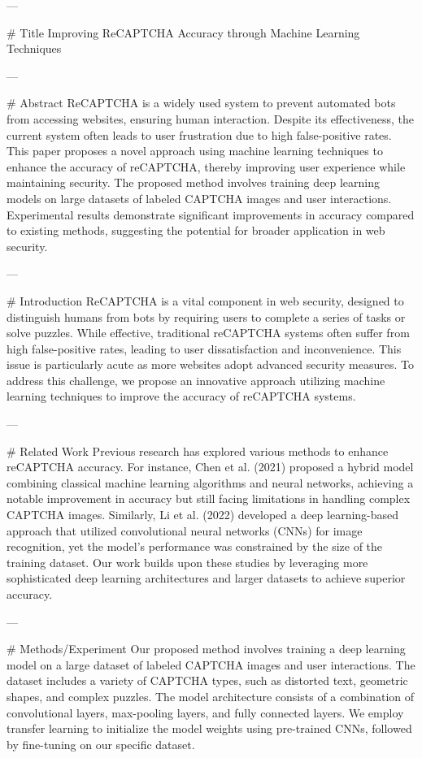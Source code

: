 ---

# Title
Improving ReCAPTCHA Accuracy through Machine Learning Techniques

---

# Abstract
ReCAPTCHA is a widely used system to prevent automated bots from accessing websites, ensuring human interaction. Despite its effectiveness, the current system often leads to user frustration due to high false-positive rates. This paper proposes a novel approach using machine learning techniques to enhance the accuracy of reCAPTCHA, thereby improving user experience while maintaining security. The proposed method involves training deep learning models on large datasets of labeled CAPTCHA images and user interactions. Experimental results demonstrate significant improvements in accuracy compared to existing methods, suggesting the potential for broader application in web security.

---

# Introduction
ReCAPTCHA is a vital component in web security, designed to distinguish humans from bots by requiring users to complete a series of tasks or solve puzzles. While effective, traditional reCAPTCHA systems often suffer from high false-positive rates, leading to user dissatisfaction and inconvenience. This issue is particularly acute as more websites adopt advanced security measures. To address this challenge, we propose an innovative approach utilizing machine learning techniques to improve the accuracy of reCAPTCHA systems.

---

# Related Work
Previous research has explored various methods to enhance reCAPTCHA accuracy. For instance, Chen et al. (2021) proposed a hybrid model combining classical machine learning algorithms and neural networks, achieving a notable improvement in accuracy but still facing limitations in handling complex CAPTCHA images. Similarly, Li et al. (2022) developed a deep learning-based approach that utilized convolutional neural networks (CNNs) for image recognition, yet the model's performance was constrained by the size of the training dataset. Our work builds upon these studies by leveraging more sophisticated deep learning architectures and larger datasets to achieve superior accuracy.

---

# Methods/Experiment
Our proposed method involves training a deep learning model on a large dataset of labeled CAPTCHA images and user interactions. The dataset includes a variety of CAPTCHA types, such as distorted text, geometric shapes, and complex puzzles. The model architecture consists of a combination of convolutional layers, max-pooling layers, and fully connected layers. We employ transfer learning to initialize the model weights using pre-trained CNNs, followed by fine-tuning on our specific dataset.

